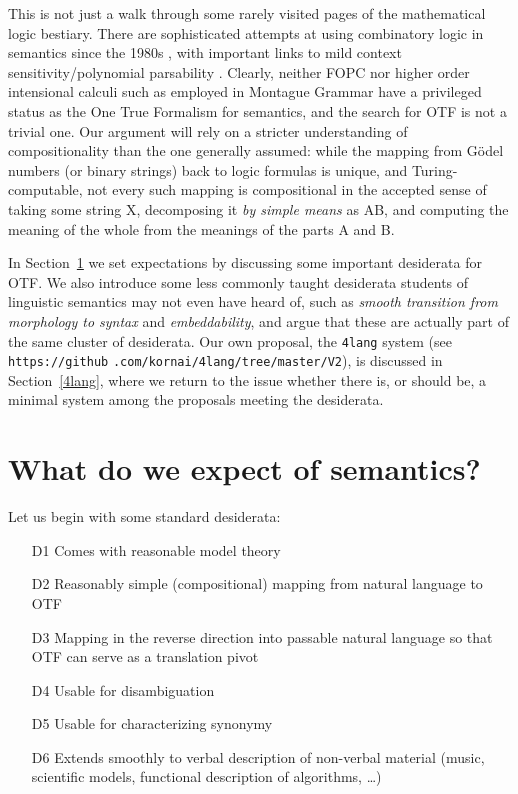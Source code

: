 \documentclass[output=paper,colorlinks=true,citecolor=brown]{langscibook}
\begin{document}
This is not just a walk through some rarely visited pages of the mathematical
logic bestiary. There are sophisticated attempts at using combinatory logic in
semantics since the 1980s
\citep{Szabolcsi:1987,Steedman:1987,Jacobson:1999,Baldridge:2002}, with
important links to mild context sensitivity/polynomial parsability
\citep{Joshi:1990}. Clearly, neither FOPC nor higher order intensional calculi
such as employed in Montague Grammar have a privileged status as the One True
Formalism for semantics, and the search for OTF is not a trivial one. Our
argument will rely on a stricter understanding of compositionality than the
one generally assumed: while the mapping from Gödel numbers (or binary
strings) back to logic formulas is unique, and Turing-computable, not every
such mapping is compositional in the accepted sense of taking some string X,
decomposing it \emph{by simple means} as AB, and computing the meaning of
the whole from the meanings of the parts A and B. 

In Section~\ref{expect} we set expectations by discussing some important
desiderata for OTF.  We also introduce some less commonly taught desiderata
students of linguistic semantics may not even have heard of, such as \emph{smooth transition from morphology to syntax} and \emph{embeddability}, and
argue that these are actually part of the same cluster of desiderata.  Our own
proposal, the \texttt{4lang} system (see \texttt{https://github}
\texttt{.com/kornai/4lang/tree/master/V2}), is discussed in
Section~\ref{4lang}, where we return to the issue whether there is, or should
be, a minimal system among the proposals meeting the desiderata.

\section{What do we expect of semantics?}\label{expect}

Let us begin with some standard desiderata: 

\begin{enumerate}
\item[D1] Comes with reasonable model theory
\item[D2] Reasonably simple (compositional) mapping from natural language to
  OTF
\item[D3] Mapping in the reverse direction into passable natural language so that
  OTF can serve as a translation pivot
\item[D4] Usable for disambiguation
\item[D5] Usable for characterizing synonymy
\item[D6] Extends smoothly to verbal description of non-verbal material (music,
  scientific models, functional description of algorithms, \ldots)
\end{enumerate}
\end{document}
